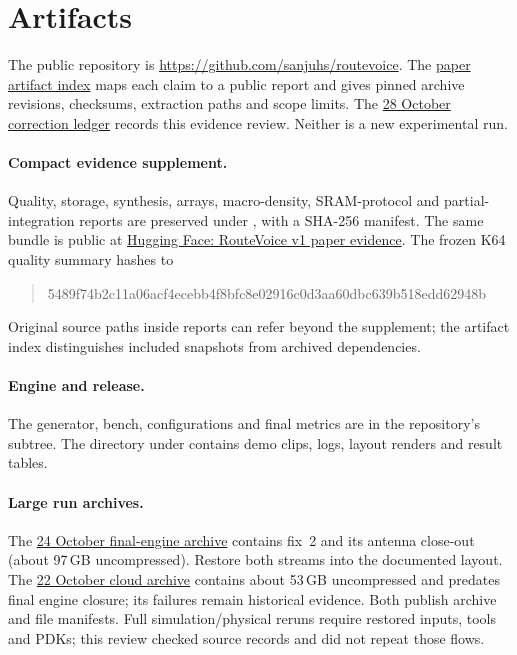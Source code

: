 \section{Artifacts}
\sloppy
\label{app:artifacts}

The public repository is \url{https://github.com/sanjuhs/routevoice}. The \href{https://github.com/sanjuhs/routevoice/blob/main/paper/ARTIFACTS.md}{paper artifact index} maps each claim to a public report and gives pinned archive revisions, checksums, extraction paths and scope limits. The \href{https://github.com/sanjuhs/routevoice/blob/main/paper/REVIEW-2026-10-28.md}{28 October correction ledger} records this evidence review. Neither is a new experimental run.

\paragraph{Compact evidence supplement.}
Quality, storage, synthesis, arrays, macro-density, SRAM-protocol and partial-integration reports are preserved under , with a SHA-256 manifest. The same bundle is public at \href{https://huggingface.co/datasets/sanjuhs/routevoice-v1-paper-evidence-20261028/tree/239114fc57b384999c2bd8576ab7f0a06706928f}{Hugging Face: RouteVoice v1 paper evidence}. The frozen K64 quality summary hashes to
\begin{quote}\scriptsize\ttfamily
5489f74b2c11a06acf4ecebb4f8bfc8e02916c0d3aa60dbc639b518edd62948b
\end{quote}
Original source paths inside reports can refer beyond the supplement; the artifact index distinguishes included snapshots from archived dependencies.

\paragraph{Engine and release.}
The generator, bench, configurations and final metrics are in the repository's  subtree. The  directory under  contains demo clips, logs, layout renders and result tables.

\paragraph{Large run archives.}
The \href{https://huggingface.co/datasets/sanjuhs/routevoice-engine-fix2-20261024/tree/c5bbf9ea0998d27ce27dd4f96c6504378d1b20e9}{24 October final-engine archive} contains fix~2 and its antenna close-out (about 97\,GB uncompressed). Restore both streams into the documented layout. The \href{https://huggingface.co/datasets/sanjuhs/routevoice-pod-final-20261022/tree/c2cee6c32d3fc353e1eac52b2664bfd198475551}{22 October cloud archive} contains about 53\,GB uncompressed and predates final engine closure; its failures remain historical evidence. Both publish archive and file manifests. Full simulation/physical reruns require restored inputs, tools and PDKs; this review checked source records and did not repeat those flows.
